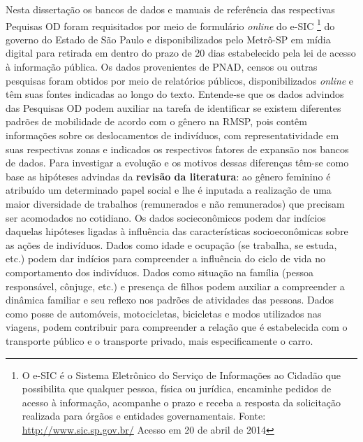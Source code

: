 Nesta dissertação os bancos de dados e manuais de referência das respectivas Pequisas OD foram requisitados por meio de formulário \emph{online} do e-SIC
\footnote{O e-SIC é o Sistema Eletrônico do Serviço de Informações ao Cidadão que possibilita que qualquer pessoa, física ou jurídica, encaminhe pedidos de acesso à informação, acompanhe o prazo e receba a resposta da solicitação realizada para órgãos e entidades governamentais. Fonte: \url{http://www.sic.sp.gov.br/} Acesso em 20 de abril de 2014} do governo do Estado de São Paulo e disponibilizados pelo Metrô-SP em mídia digital para retirada em dentro do prazo de 20 dias estabelecido pela lei de acesso à informação pública.
Os dados provenientes de PNAD, censos ou outras pesquisas foram obtidos por meio de relatórios públicos, disponibilizados \emph{online} e têm suas fontes indicadas ao longo do texto. 
Entende-se que os dados advindos das Pesquisas OD podem auxiliar na tarefa de identificar se existem diferentes padrões de mobilidade de acordo com o gênero na RMSP, pois contêm informações sobre os deslocamentos de indivíduos, com representatividade em suas respectivas zonas e indicados os respectivos fatores de expansão nos bancos de dados. 
Para investigar a evolução e os motivos dessas diferenças têm-se como base as hipóteses advindas da \textbf{revisão da literatura}: ao gênero feminino é atribuído um determinado papel social e lhe é inputada a realização de uma maior diversidade de trabalhos (remunerados e não remunerados) que precisam ser acomodados no cotidiano. 
Os dados socieconômicos podem dar indícios daquelas hipóteses ligadas à influência das características socioeconômicas sobre as ações de indivíduos. 
Dados como idade e ocupação (se trabalha, se estuda, etc.) podem dar indícios para compreender a influência do ciclo de vida no comportamento dos indivíduos. Dados como situação na família (pessoa responsável, cônjuge, etc.) e presença de filhos podem auxiliar a compreender a dinâmica familiar e seu reflexo nos padrões de atividades das pessoas. 
Dados como posse de automóveis, motocicletas, bicicletas e modos utilizados nas viagens, podem contribuir para compreender a relação que é estabelecida com o transporte público e o transporte privado, mais especificamente o carro. 

